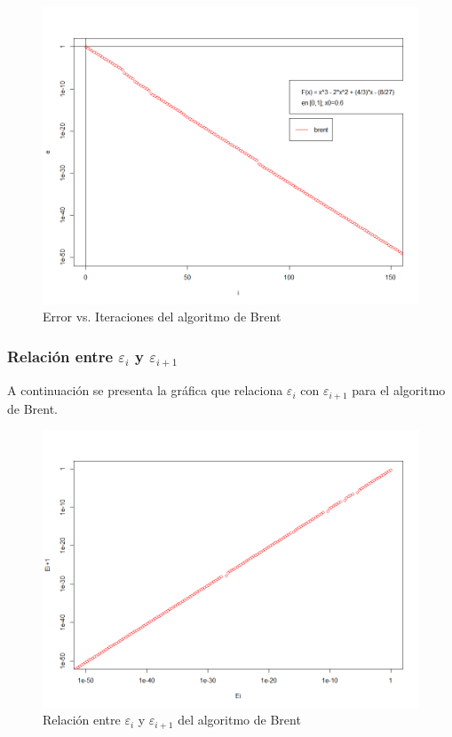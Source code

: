 \documentclass[a4paper,12pt]{article}
\begin{document}
\vspace{-2em}
\begin{figure}[ht!]
\centering
\includegraphics[scale=0.4]{img/brent_e_vs_i.png}
\vspace{-1em}
\caption{Error vs. Iteraciones del algoritmo de Brent}
\label{fig:brent_e_i}
\end{figure}

\vspace{-1em}

\subsubsection{Relación entre $\varepsilon_i$ y $\varepsilon_{i+1}$}

A continuación se presenta la gráfica que relaciona $\varepsilon_i$ con $\varepsilon_{i+1}$ para el algoritmo de Brent. \par

\vspace{-1em}
\begin{figure}[ht!]
\centering
\includegraphics[scale=0.4]{img/brent_relacion_error.png}
\vspace{-1em}
\caption{Relación entre $\varepsilon_i$ y $\varepsilon_{i+1}$ del algoritmo de Brent}
\label{fig:relacion_error_brent}
\end{figure}
\end{document}
